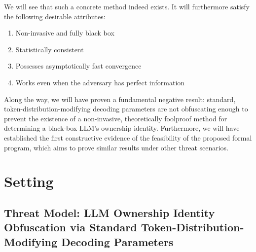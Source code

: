 \documentclass{article}
\begin{document}
We will see that such a concrete method indeed exists. It will furthermore satisfy the following desirable attributes:
\begin{enumerate}
\item Non-invasive and fully black box
\item Statistically consistent
\item Possesses asymptotically fast convergence
\item Works even when the adversary has perfect information
\end{enumerate}



Along the way, we will have proven a fundamental negative result: standard, token-distribution-modifying decoding parameters are not obfuscating enough to prevent the existence of a non-invasive, theoretically foolproof method for determining a black-box LLM’s ownership identity. Furthermore, we will have established the first constructive evidence of the feasibility of the proposed formal program, which aims to prove similar results under other threat scenarios.



\section{Setting}



\subsection{Threat Model: LLM Ownership Identity Obfuscation via Standard Token-Distribution-Modifying Decoding Parameters}
\end{document}

